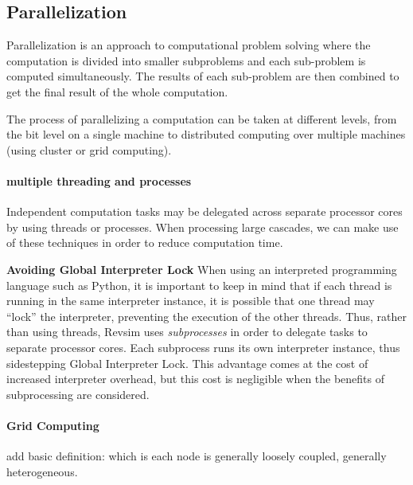\subsection{Parallelization}

Parallelization is an approach to computational problem solving where the computation is divided into smaller 
subproblems and each sub-problem is computed simultaneously. The results of each sub-problem are then combined 
to get the final result of the whole computation.

The process of parallelizing a computation can be taken at different levels, from the bit level on a single machine 
to distributed computing over multiple machines (using cluster or grid computing).

\paragraph{multiple threading and processes}
Independent computation tasks may be delegated across separate processor cores by using threads or processes. When processing large cascades, we can make use of these techniques in order to reduce computation time.

{\bf Avoiding Global Interpreter Lock} When using an interpreted programming language such as Python, it is important to keep in mind that if each thread is running in the same interpreter instance, it is possible that one thread may ``lock'' the interpreter, preventing the execution of the other threads. Thus, rather than using threads, Revsim uses \emph{subprocesses} in order to delegate tasks to separate processor cores. Each subprocess runs its own interpreter instance, thus sidestepping Global Interpreter Lock. This advantage comes at the cost of increased interpreter overhead, but this cost is negligible when the benefits of subprocessing are considered.

\paragraph{Grid Computing}
add basic definition: which is each node is generally loosely coupled, generally heterogeneous.